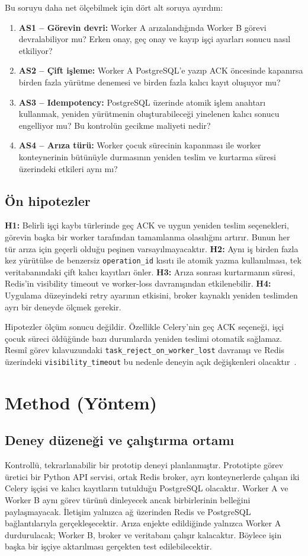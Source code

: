 \documentclass[conference,a4paper]{IEEEtran}
\newcommand{\code}[1]{\texttt{#1}}
\begin{document}
Bu soruyu daha net ölçebilmek için dört alt soruya ayırdım:
\begin{enumerate}
\item \textbf{AS1 -- Görevin devri:} Worker A arızalandığında Worker B görevi devralabiliyor mu? Erken onay, geç onay ve kayıp işçi ayarları sonucu nasıl etkiliyor?
\item \textbf{AS2 -- Çift işleme:} Worker A PostgreSQL'e yazıp ACK öncesinde kapanırsa birden fazla yürütme denemesi ve birden fazla kalıcı kayıt oluşuyor mu?
\item \textbf{AS3 -- Idempotency:} PostgreSQL üzerinde atomik işlem anahtarı kullanmak, yeniden yürütmenin oluşturabileceği yinelenen kalıcı sonucu engelliyor mu? Bu kontrolün gecikme maliyeti nedir?
\item \textbf{AS4 -- Arıza türü:} Worker çocuk sürecinin kapanması ile worker konteynerinin bütünüyle durmasının yeniden teslim ve kurtarma süresi üzerindeki etkileri aynı mı?
\end{enumerate}

\subsection{Ön hipotezler}
\textbf{H1:} Belirli işçi kaybı türlerinde geç ACK ve uygun yeniden teslim seçenekleri, görevin başka bir worker tarafından tamamlanma olasılığını artırır. Bunun her tür arıza için geçerli olduğu peşinen varsayılmayacaktır. \textbf{H2:} Aynı iş birden fazla kez yürütülse de benzersiz \code{operation\_id} kısıtı ile atomik yazma kullanılması, tek veritabanındaki çift kalıcı kayıtları önler. \textbf{H3:} Arıza sonrası kurtarmanın süresi, Redis'in visibility timeout ve worker-loss davranışından etkilenebilir. \textbf{H4:} Uygulama düzeyindeki retry ayarının etkisini, broker kaynaklı yeniden teslimden ayrı bir deneyde ölçmek gerekir.

Hipotezler ölçüm sonucu değildir. Özellikle Celery'nin geç ACK seçeneği, işçi çocuk süreci öldüğünde bazı durumlarda yeniden teslimi otomatik sağlamaz. Resmî görev kılavuzundaki \code{task\_reject\_on\_worker\_lost} davranışı ve Redis üzerindeki \code{visibility\_timeout} bu nedenle deneyin açık değişkenleri olacaktır~\cite{celerytasks,celeryredis}.

\section{Method (Yöntem)}
\subsection{Deney düzeneği ve çalıştırma ortamı}
Kontrollü, tekrarlanabilir bir prototip deneyi planlanmıştır. Prototipte görev üretici bir Python API servisi, ortak Redis broker, ayrı konteynerlerde çalışan iki Celery işçisi ve kalıcı kayıtların tutulduğu PostgreSQL olacaktır. Worker A ve Worker B aynı görev türünü dinleyecek ancak birbirlerinin belleğini paylaşmayacak. İletişim yalnızca ağ üzerinden Redis ve PostgreSQL bağlantılarıyla gerçekleşecektir. Arıza enjekte edildiğinde yalnızca Worker A durdurulacak; Worker B, broker ve veritabanı çalışır kalacaktır. Böylece işin başka bir işçiye aktarılması gerçekten test edilebilecektir.
\end{document}

